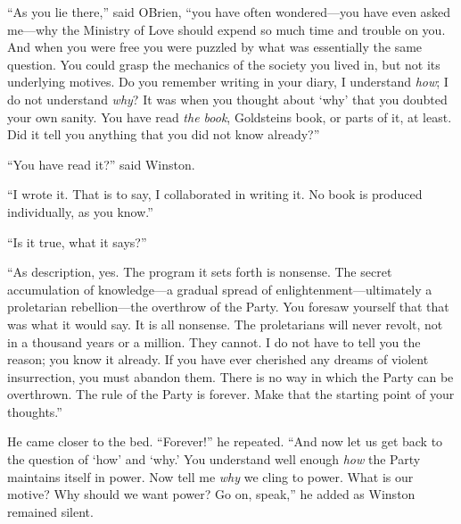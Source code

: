 ``As you lie there,'' said O\textquotesingle Brien, ``you have often
wondered---you have even asked me---why the Ministry of Love should
expend so much time and trouble on you. And when you were free you were
puzzled by what was essentially the same question. You could grasp the
mechanics of the society you lived in, but not its underlying motives.
Do you remember writing in your diary, \textquotesingle I understand
\emph{how}; I do not understand \emph{why}\textquotesingle? It was when
you thought about `why' that you
doubted your own sanity. You have read \emph{the book},
Goldstein\textquotesingle s book, or parts of it, at least. Did it tell
you anything that you did not know already?''

``You have read it?'' said Winston.

``I wrote it. That is to say, I collaborated in writing it. No book is
produced individually, as you know.''

``Is it true, what it says?''

``As description, yes. The program it sets forth is nonsense. The secret
accumulation of knowledge---a gradual spread of
enlightenment---ultimately a proletarian rebellion---the overthrow of
the Party. You foresaw yourself that that was what it would say. It is
all nonsense. The proletarians will never revolt, not in a thousand
years or a million. They cannot. I do not have to tell you the reason;
you know it already. If you have ever cherished any dreams of violent
insurrection, you must abandon them. There is no way in which the Party
can be overthrown. The rule of the Party is forever. Make that the
starting point of your thoughts.''

He came closer to the bed. ``Forever!'' he repeated. ``And now let us get
back to the question of `how' and `why.' You understand well enough
\emph{how} the Party maintains itself in power. Now tell me \emph{why} we
cling to power. What is our motive? Why should we want power? Go on,
speak,'' he added as Winston remained silent.

